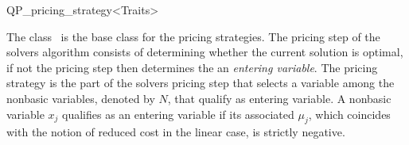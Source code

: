
\begin{ccRefClass}{QP_pricing_strategy<Traits>}

\ccDefinition
The class \ccRefName\ is the base class for the pricing strategies.
The pricing step of the solvers algorithm consists of determining  whether the
current solution is optimal, if not the pricing step then determines the an
\emph{entering variable}.
The pricing
strategy is the part of the solvers pricing step that selects a variable among
the nonbasic variables, denoted by $N$, 
that qualify as entering variable. A nonbasic variable
$x_{j}$ qualifies as an entering variable if its associated $\mu_{j}$, which
coincides with the notion of reduced cost in the linear case, is strictly
negative.



\end{ccRefClass}
